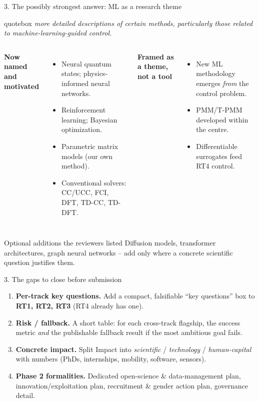 \documentclass[10pt,aspectratio=169]{beamer}
\newcommand{\reviewerquote}[1]{%
  \begin{beamercolorbox}[sep=6pt,rounded=true,shadow=true]{quotebox}%
  \itshape #1%
  \end{beamercolorbox}%
}
\begin{document}
\begin{frame}{3. The possibly strongest answer: ML as a research theme}
  \reviewerquote{more detailed descriptions of certain methods, particularly those related to
  machine-learning-guided control.}
  \vfill
  \begin{columns}[T]
    \textbf{Now named and motivated}
    \begin{itemize}\small
      \item Neural quantum states; physics-informed neural networks.
      \item Reinforcement learning; Bayesian optimization.
      \item Parametric matrix models (our own method).
      \item Conventional solvers: CC/UCC, FCI, DFT, TD-CC, TD-DFT.
    \end{itemize}
    \textbf{Framed as a theme, not a tool}
    \begin{itemize}\small
      \item New ML methodology emerges \emph{from} the control problem.
      \item PMM/T-PMM developed within the centre.
      \item Differentiable surrogates feed RT4 control.
    \end{itemize}
  \end{columns}
  \vfill
  \begin{block}{Optional additions the reviewers listed}
    \small Diffusion models, transformer architectures, graph neural networks -- add only where a
    concrete scientific question justifies them.
  \end{block}
\end{frame}

\begin{frame}{3. The gaps to close before submission}
  \begin{enumerate}
    \item \textbf{Per-track key questions.} Add a compact, falsifiable ``key questions'' box to
          \textbf{RT1, RT2, RT3} (RT4 already has one).
    \vfill
    \item \textbf{Risk / fallback.} A short table: for each cross-track flagship, the success metric
          \emph{and} the publishable fallback result if the most ambitious goal fails.
    \vfill
    \item \textbf{Concrete impact.} Split Impact into \emph{scientific} / \emph{technology} /
          \emph{human-capital} with numbers (PhDs, internships, mobility, software, sensors).
    \vfill
    \item \textbf{Phase 2 formalities.} Dedicated open-science \& data-management plan,
          innovation/exploitation plan, recruitment \& gender action plan, governance detail.
  \end{enumerate}
\end{frame}
\end{document}
